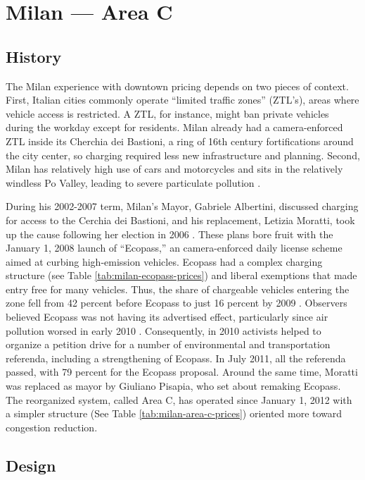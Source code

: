 
\section{Milan --- Area C}

\subsection{History}

The Milan experience with downtown pricing depends on two pieces of context. First, Italian cities commonly operate ``limited traffic zones'' (ZTL's), areas where vehicle access is restricted. A ZTL, for instance, might ban private vehicles during the workday except for residents. Milan already had a camera-enforced ZTL inside its Cherchia dei Bastioni, a ring of 16th century fortifications around the city center, so charging required less new infrastructure and planning. Second, Milan has relatively high use of cars and motorcycles and sits in the relatively windless Po Valley, leading to severe particulate pollution \citet{Rotaris2010}.

During his 2002-2007 term, Milan's Mayor, Gabriele Albertini, discussed charging for access to the Cerchia dei Bastioni, and his replacement, Letizia Moratti, took up the cause following her election in 2006 \citep{Mattioli2012}. These plans bore fruit with the January 1, 2008 launch of ``Ecopass,'' an camera-enforced daily license scheme aimed at curbing high-emission vehicles. Ecopass had a complex charging structure (see Table \ref{tab:milan-ecopass-prices}) and liberal exemptions that made entry free for many vehicles. Thus, the share of chargeable vehicles entering the zone fell from 42 percent before Ecopass to just 16 percent by 2009 \citep[p. 5, Table 3]{Danielis2011}. Observers believed Ecopass was not having its advertised effect, particularly since air pollution worsed in early 2010 \citep{Mattioli2012}. Consequently, in 2010 activists helped to organize a petition drive for a number of environmental and transportation referenda, including a strengthening of Ecopass. In July 2011, all the referenda passed, with 79 percent for the Ecopass proposal. Around the same time, Moratti was replaced as mayor by Giuliano Pisapia, who set about remaking Ecopass. The reorganized system, called Area C, has operated since January 1, 2012 with a simpler structure (See Table \ref{tab:milan-area-c-prices}) oriented more toward congestion reduction. 

\subsection{Design}

